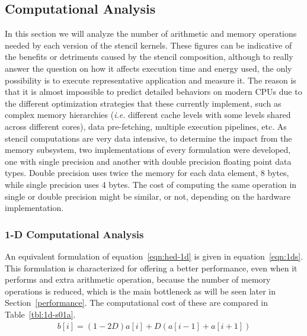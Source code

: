 \documentclass{acm_proc_article-sp}
\newcommand{\note}[1]{\todo[inline,color=yellow,bordercolor=orange,linecolor=orange]{#1}}
\begin{document}


\subsection{Computational Analysis}
\label{analysis}
In this section we will analyze the number of arithmetic and memory operations needed by each version of the stencil kernels. These figures can be indicative of the benefits or detriments caused by the stencil composition, although to really answer the question on how it affects execution time and energy used, the only possibility is to execute representative application and measure it. The reason is that it is almost impossible to predict detailed behaviors on modern CPUs due to the different optimization strategies that these currently implement, such as complex memory hierarchies (\textit{i.e.} different cache levels with some levels shared across different cores), data pre-fetching, multiple execution pipelines, etc. As stencil computations are very data intensive, to determine the impact from the memory subsystem, two implementations of every formulation were developed, one with single precision and another with double precision floating point data types. Double precision uses twice the memory for each data element, 8 bytes, while single precision uses 4 bytes. The cost of computing the same operation in single or double precision might be similar, or not, depending on the hardware implementation.

\note{TODO: make tables look nicer}

\subsubsection{1-D Computational Analysis}
An equivalent formulation of equation~\eqref{eqn:hed-1d} is given in equation~\eqref{eqn:1ds}. This formulation is characterized for offering a better performance, even when it performs and extra arithmetic operation, because the number of memory operations is reduced, which is the main bottleneck as will be seen later in Section~\ref{performance}. The computational cost of these are compared in Table~\ref{tbl:1d-s01a}.
\begin{equation}
  \begin{split}
    b[i] = (1-2D)a[i]+D(a[i-1]+a[i+1])
  \end{split}
  \label{eqn:1ds}
\end{equation}
\end{document}
